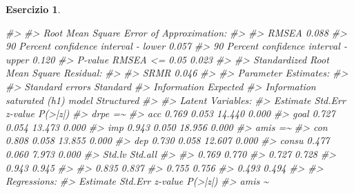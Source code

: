 \documentclass[
  11pt,
]{krantz}
\makeatletter
\newenvironment{Shaded}{\begin{snugshade}}{\end{snugshade}}
\newcommand{\CommentTok}[1]{\textcolor[rgb]{0.37,0.37,0.37}{\textit{#1}}}
\newenvironment{kframe}{%
\medskip{}
\setlength{\fboxsep}{.8em}
 \def\at@end@of@kframe{}%
 \ifinner\ifhmode%
  \def\at@end@of@kframe{\end{minipage}}%
  \begin{minipage}{\columnwidth}%
 \fi\fi%
 \def\FrameCommand##1{\hskip\@totalleftmargin \hskip-\fboxsep
 \colorbox{shadecolor}{##1}\hskip-\fboxsep
     \hskip-\linewidth \hskip-\@totalleftmargin \hskip\columnwidth}%
 \MakeFramed {\advance\hsize-\width
   \@totalleftmargin\z@ \linewidth\hsize
   \@setminipage}}%
 {\par\unskip\endMakeFramed%
 \at@end@of@kframe}
\renewenvironment{Shaded}{\begin{kframe}}{\end{kframe}}
\theoremstyle{definition}
\theoremstyle{definition}
\theoremstyle{definition}
\newtheorem{exercise}{Esercizio}[chapter]
\theoremstyle{definition}
\theoremstyle{remark}
\makeatother
\begin{document}
\begin{exercise}
\begin{Shaded}
\begin{Highlighting}[]
\CommentTok{\#\textgreater{} }
\CommentTok{\#\textgreater{} Root Mean Square Error of Approximation:}
\CommentTok{\#\textgreater{} }
\CommentTok{\#\textgreater{}   RMSEA                                          0.088}
\CommentTok{\#\textgreater{}   90 Percent confidence interval {-} lower         0.057}
\CommentTok{\#\textgreater{}   90 Percent confidence interval {-} upper         0.120}
\CommentTok{\#\textgreater{}   P{-}value RMSEA \textless{}= 0.05                          0.023}
\CommentTok{\#\textgreater{} }
\CommentTok{\#\textgreater{} Standardized Root Mean Square Residual:}
\CommentTok{\#\textgreater{} }
\CommentTok{\#\textgreater{}   SRMR                                           0.046}
\CommentTok{\#\textgreater{} }
\CommentTok{\#\textgreater{} Parameter Estimates:}
\CommentTok{\#\textgreater{} }
\CommentTok{\#\textgreater{}   Standard errors                             Standard}
\CommentTok{\#\textgreater{}   Information                                 Expected}
\CommentTok{\#\textgreater{}   Information saturated (h1) model          Structured}
\CommentTok{\#\textgreater{} }
\CommentTok{\#\textgreater{} Latent Variables:}
\CommentTok{\#\textgreater{}                    Estimate  Std.Err  z{-}value  P(\textgreater{}|z|)}
\CommentTok{\#\textgreater{}   drpe =\textasciitilde{}                                             }
\CommentTok{\#\textgreater{}     acc               0.769    0.053   14.440    0.000}
\CommentTok{\#\textgreater{}     goal              0.727    0.054   13.473    0.000}
\CommentTok{\#\textgreater{}     imp               0.943    0.050   18.956    0.000}
\CommentTok{\#\textgreater{}   amis =\textasciitilde{}                                             }
\CommentTok{\#\textgreater{}     con               0.808    0.058   13.855    0.000}
\CommentTok{\#\textgreater{}     dep               0.730    0.058   12.607    0.000}
\CommentTok{\#\textgreater{}     consu             0.477    0.060    7.973    0.000}
\CommentTok{\#\textgreater{}    Std.lv  Std.all}
\CommentTok{\#\textgreater{}                   }
\CommentTok{\#\textgreater{}     0.769    0.770}
\CommentTok{\#\textgreater{}     0.727    0.728}
\CommentTok{\#\textgreater{}     0.943    0.945}
\CommentTok{\#\textgreater{}                   }
\CommentTok{\#\textgreater{}     0.835    0.837}
\CommentTok{\#\textgreater{}     0.755    0.756}
\CommentTok{\#\textgreater{}     0.493    0.494}
\CommentTok{\#\textgreater{} }
\CommentTok{\#\textgreater{} Regressions:}
\CommentTok{\#\textgreater{}                    Estimate  Std.Err  z{-}value  P(\textgreater{}|z|)}
\CommentTok{\#\textgreater{}   amis \textasciitilde{}                                              }

\end{Highlighting}
\end{Shaded}
\end{exercise}
\end{document}
